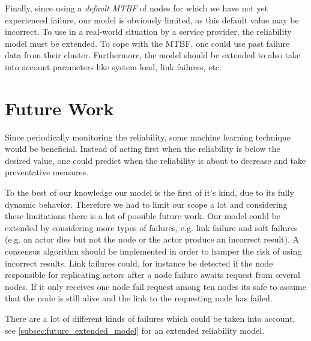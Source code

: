 \documentclass{cslthse-msc}
\begin{document}
Finally, since using a \emph{default MTBF} of nodes for which we have not yet experienced failure, our model is obviously limited, as this default value may be incorrect. To use in a real-world situation by a service provider, the reliability model must be extended. To cope with the MTBF, one could use past failure data from their cluster. Furthermore, the model should be extended to also take into account parameters like system load, link failures, etc. 



\chapter{Future Work} \label{ch:future_work}
Since periodically monitoring the reliability, some machine learning technique would be beneficial. Instead of acting first when the reliability is below the desired value, one could predict when the reliability is about to decrease and take preventative measures.

To the best of our knowledge our model is the first of it's kind, due to its fully dynamic behavior. Therefore we had to limit our scope a lot and considering these limitations there is a lot of possible future work. Our model could be extended by considering more types of failures, e.g. link failure and soft failures (e.g. an actor dies but not the node or the actor produce an incorrect result). A consensus algorithm should be implemented in order to hamper the risk of using incorrect results. Link failures could, for instance be detected if the node responsible for replicating actors after a node failure awaits request from several nodes. If it only receives one node fail request among ten nodes its safe to assume that the node is still alive and the link to the requesting node has failed.

There are a lot of different kinds of failures which could be taken into account, see \cref{subsec:future_extended_model} for an extended reliability model.
\end{document}
